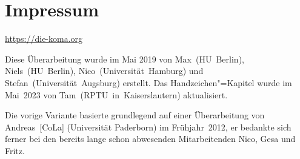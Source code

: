 \chapter{Impressum}
\begin{center}
    \url{https://die-koma.org}
\end{center}

\vspace{2em}

\noindent Diese Überarbeitung wurde im Mai 2019 von \mbox{Max (HU Berlin)}, \mbox{Niels (HU Berlin)}, \mbox{Nico (Universität Hamburg)} und \mbox{Stefan (Universität Augsburg)} erstellt.
Das  Handzeichen"=Kapitel wurde im Mai~2023 von \mbox{Tam (RPTU in Kaiserslautern)} aktualisiert.
\vspace{1em}

\noindent Die vorige Variante basierte grundlegend auf einer Überarbeitung von \mbox{Andreas [CoLa]} (Universität Paderborn) im Frühjahr~2012, er bedankte sich ferner bei den bereits lange schon abwesenden Mitarbeitenden Nico, Gesa und Fritz.